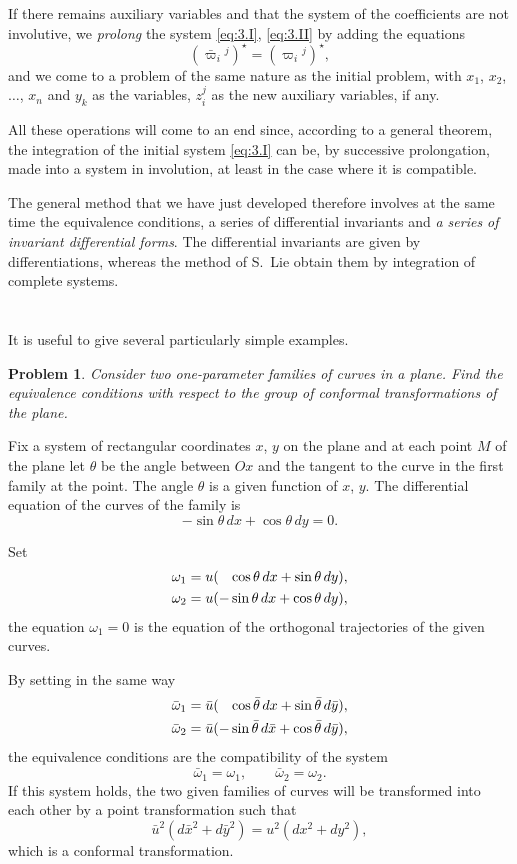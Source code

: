\documentclass[leqno,11pt]{article}
\theoremstyle{shape1}
\newtheorem{prob}[thm]{Problem}
\theoremstyle{shape0}
\theoremstyle{shape2}
\theoremstyle{definition}
\newcommand{\vp}{\varpi}
\begin{document}
If there remains auxiliary variables and that the system of the coefficients are not involutive, we \emph{prolong} the system \eqref{eq:3.I}, \eqref{eq:3.II} by adding the equations
\[
(\bar\vp_{i}{}^{j})^{\star}=(\vp_{i}{}^{j})^{\star},
\]
and we come to a problem of the same nature as the initial problem, with $x_{1}$, $x_{2}$, $\dots$, $x_{n}$ and $y_{k}$ as the variables, $z_{i}^{j}$ as the new auxiliary variables, if any.

All these operations will come to an end since, according to a general theorem, the integration of the initial system \eqref{eq:3.I} can be, by successive prolongation, made into a system in involution, at least in the case where it is compatible.

The general method that we have just developed therefore involves at the same time the equivalence conditions, a series of differential invariants and \emph{a series of invariant differential forms}. The differential invariants are given by differentiations, whereas the method of S.~Lie obtain them by integration of complete systems.

\section{}
\label{sec:4}
It is useful to give several particularly simple examples.

\begin{prob}
  Consider two one-parameter families of curves in a plane. Find the equivalence conditions with respect to the group of conformal transformations of the plane.
\end{prob}

Fix a system of rectangular coordinates $x$, $y$ on the plane and at each point $M$ of the plane let $\theta$ be the angle between $Ox$ and the tangent to the curve in the first family at the point. The angle $\theta$ is a given function of $x$, $y$. The differential equation of the curves of the family is
\[
-\sin\theta\,dx+\cos\theta\,dy=0.
\]

Set
\begin{align*}
  \omega_{1}&=u(\hphantom{+}\cos\theta\,dx+\sin\theta\,dy),\\
  \omega_{2}&=u({-}\sin\theta\,dx+\cos\theta\,dy),
\end{align*}
the equation $\omega_{1}=0$ is the equation of the orthogonal trajectories of the given curves.

By setting in the same way
\begin{align*}
  \bar\omega_{1}&=\bar u(\hphantom{+}\cos\bar\theta\,dx+\sin\bar\theta\,d\bar y),\\
  \bar\omega_{2}&=\bar u({-}\sin\bar\theta\,d\bar x+\cos\bar\theta\,d\bar y),
\end{align*}
the equivalence conditions are the compatibility of the system
\begin{equation}
  \label{eq:4.1}\tag{1}
  \bar\omega_{1}=\omega_{1},\qquad\bar\omega_{2}=\omega_{2}.
\end{equation}
If this system holds, the two given families of curves will be transformed into each other by a point transformation such that
\[
\bar u^{2}(d\bar x^{2}+d\bar y^{2})=u^{2}(dx^{2}+dy^{2}),
\]
which is a conformal transformation.
\end{document}

